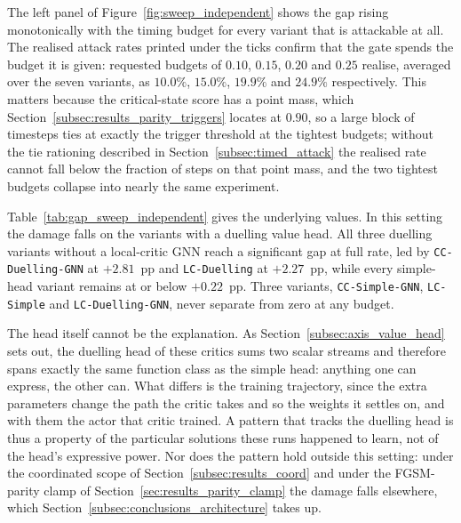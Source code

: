 The left panel of Figure~\ref{fig:sweep_independent} shows the gap rising
monotonically with the timing budget for every variant that is attackable at all.
The realised attack rates printed under the ticks confirm that the gate spends the
budget it is given: requested budgets of $0.10$, $0.15$, $0.20$ and $0.25$ realise,
averaged over the seven variants, as $10.0\%$, $15.0\%$, $19.9\%$ and $24.9\%$
respectively. This matters because the critical-state score has a point mass, which
Section~\ref{subsec:results_parity_triggers} locates at $0.90$, so a large block of
timesteps ties at exactly the trigger threshold at the tightest budgets; without the
tie rationing described in Section~\ref{subsec:timed_attack} the realised rate cannot
fall below the fraction of steps on that point mass, and the two tightest budgets
collapse into nearly the same experiment.

Table~\ref{tab:gap_sweep_independent} gives the underlying values. In this setting the
damage falls on the variants with a duelling value head. All three duelling
variants without a local-critic GNN reach a significant gap at full rate, led by
\texttt{CC-Duelling-GNN} at $+2.81$~pp and \texttt{LC-Duelling} at $+2.27$~pp, while
every simple-head variant remains at or below $+0.22$~pp. Three variants,
\texttt{CC-Simple-GNN}, \texttt{LC-Simple} and \texttt{LC-Duelling-GNN}, never
separate from zero at any budget.

The head itself cannot be the explanation. As Section~\ref{subsec:axis_value_head}
sets out, the duelling head of these critics sums two scalar streams and therefore spans
exactly the same function class as the simple head: anything one can express, the other
can. What differs is the training trajectory, since the extra parameters change the path
the critic takes and so the weights it settles on, and with them the actor that critic
trained. A pattern that tracks the duelling head is thus a property of the particular
solutions these runs happened to learn, not of the head's expressive power. Nor does the
pattern hold outside this setting: under the coordinated scope of
Section~\ref{subsec:results_coord} and under the FGSM-parity clamp of
Section~\ref{sec:results_parity_clamp} the damage falls elsewhere, which
Section~\ref{subsec:conclusions_architecture} takes up.

